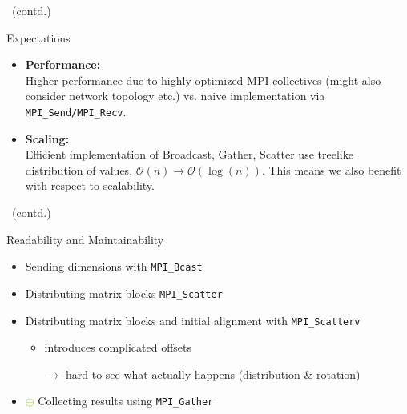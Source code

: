 \documentclass[9pt,pdftex,xcolor=dvipsnames]{beamer}
\begin{document}
\begin{frame}{\insertsubsection \ (contd.)}
\begin{block}{Expectations}
\begin{itemize}
\item \textbf{Performance:\\}
Higher performance due to highly optimized MPI collectives (might also consider network topology etc.) vs. naive implementation via \lstinline[basicstyle=\ttfamily]{MPI_Send/MPI_Recv}.

\item \textbf{Scaling:\\}
Efficient implementation of Broadcast, Gather, Scatter use treelike distribution of values, $\mathcal{O}\left(n\right) \rightarrow \mathcal{O}\left(\log(n)\right)$. This means we also benefit with respect to scalability.
\end{itemize}
\end{block}
\end{frame}


\begin{frame}{\insertsubsection \ (contd.)}
\begin{block}{Readability and Maintainability}
\begin{itemize}
\item[\textcolor{YellowGreen}{$\bm\oplus$}] Sending dimensions with \lstinline[basicstyle=\ttfamily]{MPI_Bcast}
\item[\textcolor{YellowGreen}{$\bm\oplus$}] Distributing matrix blocks \lstinline[basicstyle=\ttfamily]{MPI_Scatter}
\item[\textcolor{red}{$\bm\ominus$}]
Distributing matrix blocks and initial alignment with \lstinline[basicstyle=\ttfamily]{MPI_Scatterv} 
	\begin{itemize}
	\item[$\rightarrow$] introduces complicated offsets 
	\item[$\rightarrow$] hard to see what actually happens (distribution \& rotation)
	\end{itemize} 
\item[\textcolor{YellowGreen}{$\bm{\oplus}$}] Collecting results using \lstinline[basicstyle=\ttfamily]{MPI_Gather}
\end{itemize}
\end{block}
\end{frame}
\end{document}
